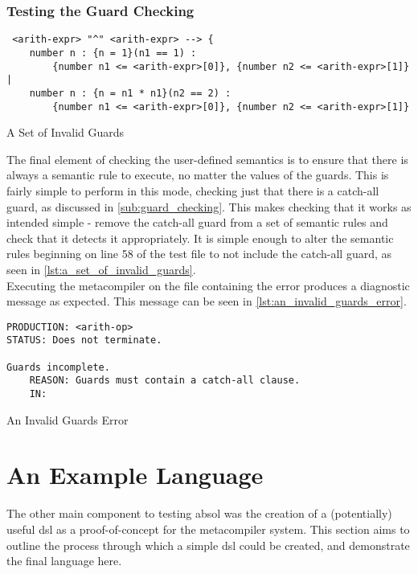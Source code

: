 \subsubsection{Testing the Guard Checking} %
\label{ssub:testing_the_guard_checking}
\begin{listing}[!htb]
\begin{verbatim}
 <arith-expr> "^" <arith-expr> --> {
    number n : {n = 1}(n1 == 1) :
        {number n1 <= <arith-expr>[0]}, {number n2 <= <arith-expr>[1]} |
    number n : {n = n1 * n1}(n2 == 2) :
        {number n1 <= <arith-expr>[0]}, {number n2 <= <arith-expr>[1]}
\end{verbatim}
\caption{A Set of Invalid Guards}
\label{lst:a_set_of_invalid_guards}
\end{listing}

The final element of checking the user-defined semantics is to ensure that there is always a semantic rule to execute, no matter the values of the guards. 
This is fairly simple to perform in this mode, checking just that there is a catch-all guard, as discussed in \autoref{sub:guard_checking}. 
This makes checking that it works as intended simple - remove the catch-all guard from a set of semantic rules and check that it detects it appropriately.
It is simple enough to alter the semantic rules beginning on line 58 of the test file to not include the catch-all guard, as seen in \autoref{lst:a_set_of_invalid_guards}. \\

Executing the metacompiler on the file containing the error produces a diagnostic message as expected.
This message can be seen in \autoref{lst:an_invalid_guards_error}.

\begin{listing}[!htb]
\begin{verbatim}
PRODUCTION: <arith-op>
STATUS: Does not terminate.

Guards incomplete.
    REASON: Guards must contain a catch-all clause.
    IN:
\end{verbatim}
\caption{An Invalid Guards Error}
\label{lst:an_invalid_guards_error}
\end{listing}




\section{An Example Language} %
\label{sec:an_example_language}
The other main component to testing \gls{absol} was the creation of a (potentially) useful \gls{dsl} as a proof-of-concept for the metacompiler system. 
This section aims to outline the process through which a simple \gls{dsl} could be created, and demonstrate the final language here. 

